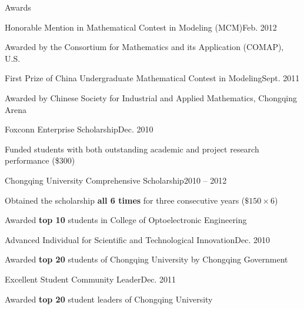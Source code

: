 \documentclass{resume} %
\begin{document}
	\begin{rSection}{Awards}
		\begin{rSubsection}{Honorable Mention in Mathematical Contest in Modeling (MCM)}{Feb. 2012}{}{}
			\item Awarded by the Consortium for Mathematics and its Application (COMAP), U.S.
		\end{rSubsection}
		
		\begin{rSubsection}{First Prize of China Undergraduate Mathematical Contest in Modeling}{Sept. 2011}{}{}
			\item Awarded by Chinese Society for Industrial and Applied Mathematics, Chongqing Arena
		\end{rSubsection}
		
		\begin{rSubsection}{Foxconn Enterprise Scholarship}{Dec. 2010}{}{}
			\item Funded students with both outstanding academic and project research performance (\$300)
		\end{rSubsection}
		
		\begin{rSubsection}{Chongqing University Comprehensive Scholarship}{2010 -- 2012}{}{}
			\item Obtained the scholarship \textbf{all 6 times} for three consecutive years ($\$150\times6$)
			\item Awarded \textbf{top 10} students in College of Optoelectronic Engineering
		\end{rSubsection}
		
		\begin{rSubsection}{Advanced Individual for Scientific and Technological Innovation}{Dec. 2010}{}{}
			\item Awarded \textbf{top 20} students of Chongqing University by Chongqing Government
		\end{rSubsection}
		
		\begin{rSubsection}{Excellent Student Community Leader}{Dec. 2011}{}{}
			\item Awarded \textbf{top 20} student leaders of Chongqing University
		\end{rSubsection}
		
	\end{rSection}
	
	
\end{document}
